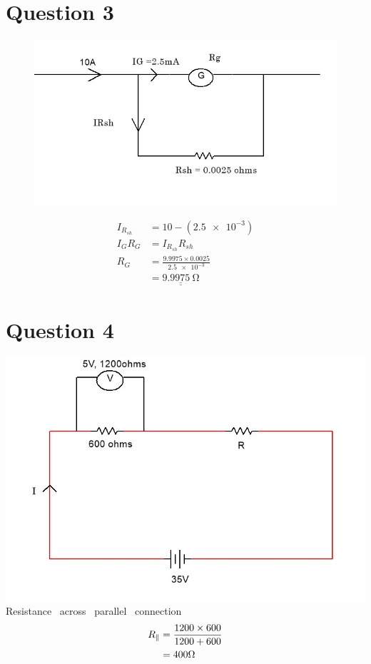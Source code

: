 \documentclass[12pt]{article}
\begin{document}
\vspace{1cm}
\section*{Question 3}
\begin{figure}[h]
	\includegraphics[width=\textwidth]{ques3}
	\centering
\end{figure}
\begin{align*}
	I_{R_{sh}} &= \num{10} - (\num{2.5e-3}) \\
	I_G R_G &= I_{R_{sh}} R_{sh} \\
	R_G &= \frac{\num{9.9975} \times \num{0.0025}}{\num{2.5e-3}} \\
		&= \underline{\underline{\qty{9.9975}{\ohm}}}
\end{align*}

\vspace{1cm}
\section*{Question 4}
\includegraphics[width=\textwidth]{ques4} \\
 Resistance \ across \ parallel \ connection 
\begin{align*}
\noindent R_{\|} &= \frac{1200 \times 600}{1200 + 600} \\
	&= 400 \Omega
\end{align*}
\end{document}
